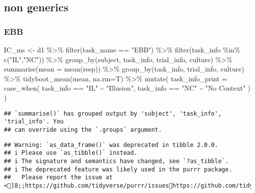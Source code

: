 \documentclass[
]{article}
\newenvironment{Shaded}{\begin{snugshade}}{\end{snugshade}}
\newcommand{\AttributeTok}[1]{\textcolor[rgb]{0.77,0.63,0.00}{#1}}
\newcommand{\FunctionTok}[1]{\textcolor[rgb]{0.00,0.00,0.00}{#1}}
\newcommand{\NormalTok}[1]{#1}
\newcommand{\OtherTok}[1]{\textcolor[rgb]{0.56,0.35,0.01}{#1}}
\newcommand{\SpecialCharTok}[1]{\textcolor[rgb]{0.00,0.00,0.00}{#1}}
\newcommand{\StringTok}[1]{\textcolor[rgb]{0.31,0.60,0.02}{#1}}
\begin{document}
\hypertarget{non-generics}{%
\subsection{non generics}\label{non-generics}}

\hypertarget{ebb}{%
\subsubsection{EBB}\label{ebb}}

\begin{Shaded}
\begin{Highlighting}[]
\NormalTok{IC\_ms }\OtherTok{\textless{}{-}}\NormalTok{ d1 }\SpecialCharTok{\%\textgreater{}\%}
  \FunctionTok{filter}\NormalTok{(task\_name }\SpecialCharTok{==} \StringTok{"EBB"}\NormalTok{) }\SpecialCharTok{\%\textgreater{}\%}
  \FunctionTok{filter}\NormalTok{(task\_info }\SpecialCharTok{\%in\%} \FunctionTok{c}\NormalTok{(}\StringTok{"IL"}\NormalTok{,}\StringTok{"NC"}\NormalTok{)) }\SpecialCharTok{\%\textgreater{}\%}
  \FunctionTok{group\_by}\NormalTok{(subject, task\_info, trial\_info, culture) }\SpecialCharTok{\%\textgreater{}\%}
  \FunctionTok{summarise}\NormalTok{(}\AttributeTok{mean =} \FunctionTok{mean}\NormalTok{(resp)) }\SpecialCharTok{\%\textgreater{}\%}
  \FunctionTok{group\_by}\NormalTok{(task\_info, trial\_info, culture) }\SpecialCharTok{\%\textgreater{}\%}
  \FunctionTok{tidyboot\_mean}\NormalTok{(mean, }\AttributeTok{na.rm=}\NormalTok{T) }\SpecialCharTok{\%\textgreater{}\%} 
  \FunctionTok{mutate}\NormalTok{(}
    \AttributeTok{task\_info\_print =} \FunctionTok{case\_when}\NormalTok{(}
\NormalTok{      task\_info }\SpecialCharTok{==} \StringTok{"IL"} \SpecialCharTok{\textasciitilde{}} \StringTok{"Illusion"}\NormalTok{, }
\NormalTok{      task\_info }\SpecialCharTok{==} \StringTok{"NC"} \SpecialCharTok{\textasciitilde{}} \StringTok{"No Context"}
\NormalTok{    )}
\NormalTok{  )}
\end{Highlighting}
\end{Shaded}

\begin{verbatim}
## `summarise()` has grouped output by 'subject', 'task_info', 'trial_info'. You
## can override using the `.groups` argument.
\end{verbatim}

\begin{verbatim}
## Warning: `as_data_frame()` was deprecated in tibble 2.0.0.
## i Please use `as_tibble()` instead.
## i The signature and semantics have changed, see `?as_tibble`.
## i The deprecated feature was likely used in the purrr package.
##   Please report the issue at <]8;;https://github.com/tidyverse/purrr/issueshttps://github.com/tidyverse/purrr/issues]8;;>.
\end{verbatim}
\end{document}
